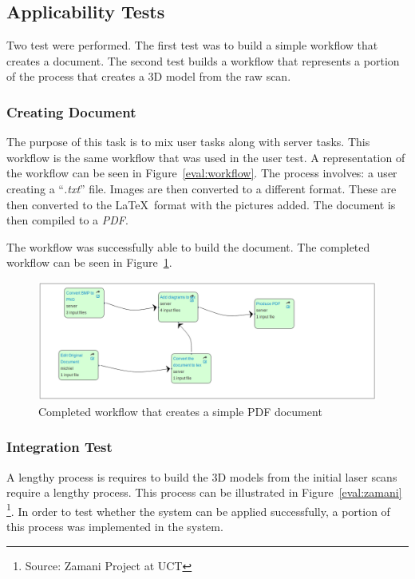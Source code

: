 \subsection{Applicability Tests}
Two test were performed. The first test was to build a simple workflow that
creates a document. The second test builds a workflow that represents a portion
of the process that creates a 3D model from the raw scan.




\subsubsection{Creating Document}
The purpose of this task is to mix user tasks along with server tasks. This
workflow is the same workflow that was used in the user test. A representation
of the workflow can be seen in Figure~\ref{eval:workflow}.
The process involves: a user creating a ``\emph{.txt}'' file. Images are then
converted to a different format. These are then converted to the \LaTeX~format
with the pictures added. The document is then compiled to a \emph{PDF}.

The workflow was successfully able to build the document. The completed workflow
can be seen in Figure~\ref{eval:document}.

\begin{figure}[!h]
    \begin{center}
        \includegraphics[scale=0.45]{figures/document_test.png}
    \end{center}
    \caption{Completed workflow that creates a simple PDF document}
    \label{eval:document}
\end{figure}

\subsubsection{Integration Test}
A lengthy process is requires to build the 3D models from the initial laser scans require a lengthy
process. This process can be illustrated in Figure~\ref{eval:zamani}
\footnote{Source: Zamani Project at UCT}.
 In order to test whether the system can be applied successfully, a portion of this process
was implemented in the system.

